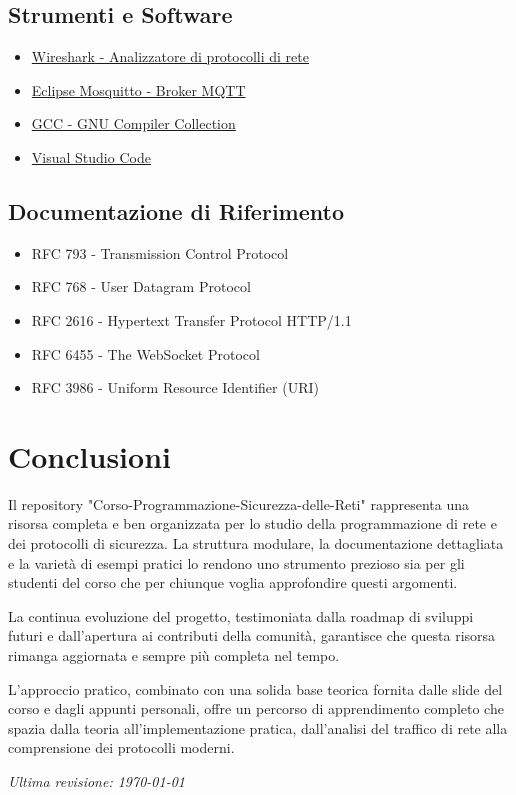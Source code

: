 \documentclass[12pt,a4paper]{article}
\begin{document}
\subsection{Strumenti e Software}
\begin{itemize}
    \item \href{https://www.wireshark.org/}{Wireshark - Analizzatore di protocolli di rete}
    \item \href{https://mosquitto.org/}{Eclipse Mosquitto - Broker MQTT}
    \item \href{https://gcc.gnu.org/}{GCC - GNU Compiler Collection}
    \item \href{https://code.visualstudio.com/}{Visual Studio Code}
\end{itemize}

\subsection{Documentazione di Riferimento}
\begin{itemize}
    \item RFC 793 - Transmission Control Protocol
    \item RFC 768 - User Datagram Protocol  
    \item RFC 2616 - Hypertext Transfer Protocol HTTP/1.1
    \item RFC 6455 - The WebSocket Protocol
    \item RFC 3986 - Uniform Resource Identifier (URI)
\end{itemize}

\section{Conclusioni}

Il repository "Corso-Programmazione-Sicurezza-delle-Reti" rappresenta una risorsa completa e ben organizzata per lo studio della programmazione di rete e dei protocolli di sicurezza. La struttura modulare, la documentazione dettagliata e la varietà di esempi pratici lo rendono uno strumento prezioso sia per gli studenti del corso che per chiunque voglia approfondire questi argomenti.

La continua evoluzione del progetto, testimoniata dalla roadmap di sviluppi futuri e dall'apertura ai contributi della comunità, garantisce che questa risorsa rimanga aggiornata e sempre più completa nel tempo.

L'approccio pratico, combinato con una solida base teorica fornita dalle slide del corso e dagli appunti personali, offre un percorso di apprendimento completo che spazia dalla teoria all'implementazione pratica, dall'analisi del traffico di rete alla comprensione dei protocolli moderni.

\vfill
\begin{center}
\textit{Ultima revisione: \today}
\end{center}
\end{document}

